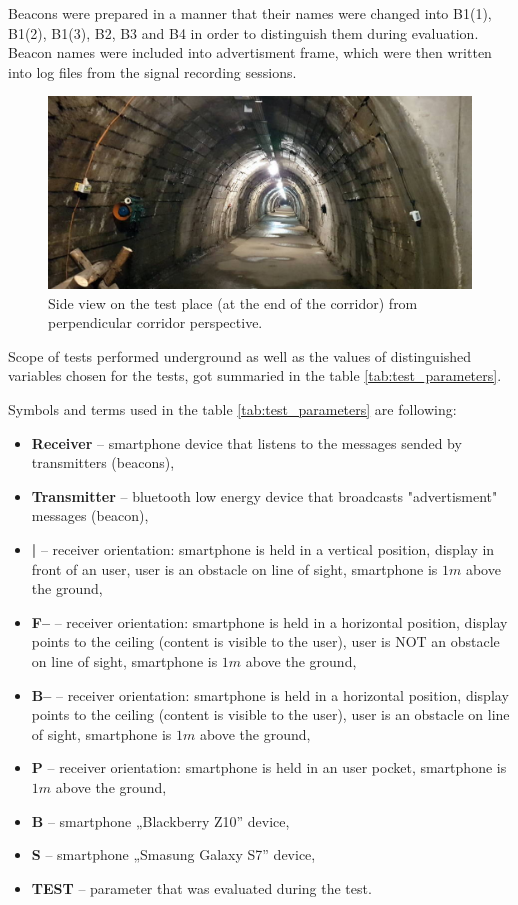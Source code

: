 \documentclass[../main.tex]{subfiles}
\begin{document}
Beacons were prepared in a manner that their names were changed into B1(1), B1(2), B1(3), B2, B3 and B4 in order to distinguish them during evaluation. Beacon names were included into advertisment frame, which were then written into log files from the signal recording sessions.

\begin{figure}[!htbp]
\includegraphics[width=\textwidth, keepaspectratio]{pictures/tests_corridor_general.pdf}
\centering
\caption{Side view on the test place (at the end of the corridor) from perpendicular corridor perspective.}
\label{fig:tests_corridor_genera}
\end{figure}


Scope of tests performed underground as well as the values of distinguished variables chosen for the tests, got summaried in the table \ref{tab:test_parameters}.

Symbols and terms used in the table \ref{tab:test_parameters} are following:
\begin{itemize}
	\item \textbf{Receiver} -- smartphone device that listens to the messages sended by transmitters (beacons),
	\item \textbf{Transmitter} -- bluetooth low energy device that broadcasts "advertisment" messages (beacon),
	\item \textbf{|} -- receiver orientation: smartphone is held in a vertical position, display in front of an user, user is an obstacle on line of sight, smartphone is $1m$ above the ground,
	\item \textbf{F--} --	receiver orientation: smartphone is held in a horizontal position, display points to the ceiling (content is visible to the user), user is NOT an obstacle on line of sight, smartphone is $1m$ above the ground,
	\item \textbf{B--} --	receiver orientation: smartphone is held in a horizontal position, display points to the ceiling (content is visible to the user), user is an obstacle on line of sight, smartphone is $1m$ above the ground,
	\item \textbf{P}	-- receiver orientation: smartphone is held in an user pocket, smartphone is $1m$ above the ground,
	\item \textbf{B}	-- smartphone „Blackberry Z10” device,
	\item \textbf{S}	-- smartphone „Smasung Galaxy S7” device,
	\item \textbf{TEST} -- parameter that was evaluated during the test.
\end{itemize}
\end{document}
